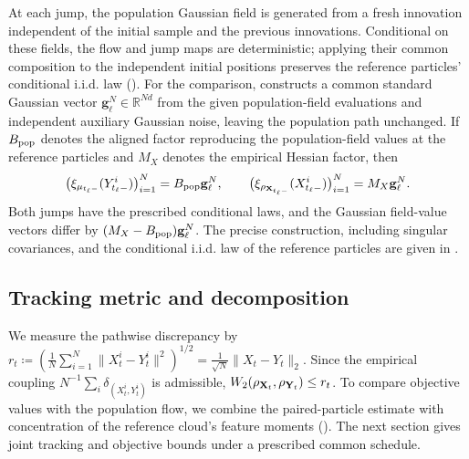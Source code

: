 At each jump, the population Gaussian field is generated from a fresh
innovation independent of the initial sample and the previous innovations.
Conditional on these fields, the flow and jump maps are deterministic;
applying their common composition to the independent initial positions
preserves the reference particles' conditional i.i.d. law
().
For the comparison,  constructs a common
standard Gaussian vector \(\mathbf g_\ell^N\in\mathbb R^{Nd}\) from the given
population-field evaluations and independent auxiliary Gaussian noise,
leaving the population path unchanged. If
\(B_{\rm pop}\) denotes the aligned factor reproducing the population-field
values at the reference particles and \(M_X\) denotes the empirical Hessian
factor, then
\[
    \bigl(\xi_{\mu_{t_\ell-}}(Y^i_{t_\ell-})\bigr)_{i=1}^N
    =B_{\rm pop}\mathbf g_\ell^N,
    \qquad
    \bigl(\xi_{\rho_{\mathbf X_{t_\ell-}}}(X^i_{t_\ell-})\bigr)_{i=1}^N
    =M_X\mathbf g_\ell^N.
\]
Both jumps have the prescribed conditional laws, and the Gaussian
field-value vectors differ by \((M_X-B_{\rm pop})\mathbf g_\ell^N\).
The precise construction, including
singular covariances, and the conditional i.i.d. law of the reference particles
are given in
.

\subsection{Tracking metric and decomposition}
\label{subsec:tracking-metric}

We measure the pathwise discrepancy by
$r_t
    \coloneq 
    \left(\frac1N\sum_{i=1}^N \|X^i_t-Y^i_t\|^2\right)^{1/2}
    =
    \frac1{\sqrt N}\|X_t-Y_t\|_2.
    \label{eq:tracking-metric}
$
Since the empirical coupling \(N^{-1}\sum_i\delta_{(X^i_t,Y^i_t)}\) is admissible, $W_2(\rho_{\mathbf X_t},\rho_{\mathbf Y_t})\le r_t$.
To compare objective values with the population flow, we combine the
paired-particle estimate with concentration of the reference cloud's feature
moments ().
The next section gives joint tracking and objective bounds under a prescribed
common schedule.
